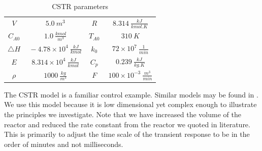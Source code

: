 \documentclass[../masters.tex]{subfiles}
\begin{document}
\begin{table}[H]
\begin{center}
\begin{tabular}{c c c c}
\hline
$V$ & $~5.0~m^3$ & $R$ & $~8.314~\frac{kJ}{kmol.K}$ \\
$C_{A0}$ & $~1.0~\frac{kmol}{m^3}$ &$T_{A0}$ & $~310~K$ \\
$\triangle H$ & $~-4.78\times 10^{4}~\frac{kJ}{kmol}$ & $k_{0}$ & $~72\times 10^{7}~\frac{1}{min}$ \\
$E$ & $~8.314\times 10^4~\frac{kJ}{kmol}$ & $C_{p}$ & $~0.239~\frac{kJ}{kg.K}$ \\
$\rho$ & $~1000~\frac{kg}{m^3}$ & 
$F$ & $~100\times 10^{-3}~\frac{m^3}{min}$ \\
\hline
\end{tabular}
\caption{CSTR parameters}
\label{tab_params}
\end{center}
\end{table}
The CSTR model is a familiar control example. Similar models may be found in \cite{du}\cite{cervantes}\cite{pan}\cite{yazdi}. We use this model because it is low dimensional yet complex enough to illustrate the principles we investigate. Note that we have increased the volume of the reactor and reduced the rate constant from the reactor we quoted in literature. This is primarily to adjust the time scale of the transient response to be in the order of minutes and not milliseconds.
\end{document}
